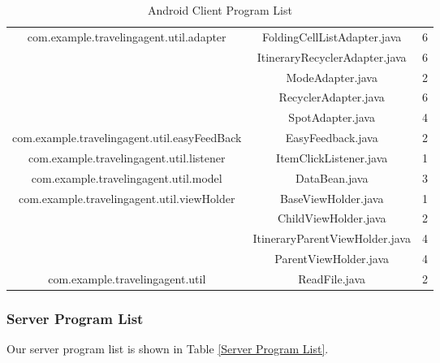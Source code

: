 \documentclass[10pt]{article}
\begin{document}
\begin{table}[htb]
\begin{tabular}{|c|c|c|}
		\multirow{4}{*}{com.example.travelingagent.util.adapter}
		&FoldingCellListAdapter.java &6 \\
		\cline{2-3}
		&ItineraryRecyclerAdapter.java &6 \\
		\cline{2-3}
		&ModeAdapter.java &2 \\
		\cline{2-3}
		&RecyclerAdapter.java &6 \\
		\cline{2-3}
		&SpotAdapter.java &4 \\
		\hline
		
		com.example.travelingagent.util.easyFeedBack &EasyFeedback.java &2 \\
		\hline
		
		com.example.travelingagent.util.listener &ItemClickListener.java &1 \\
		\hline
		
		com.example.travelingagent.util.model &DataBean.java &3 \\
		\hline
		
		\multirow{4}{*}{com.example.travelingagent.util.viewHolder}
		&BaseViewHolder.java &1 \\
		\cline{2-3}
		&ChildViewHolder.java &2 \\
		\cline{2-3}
		&ItineraryParentViewHolder.java &4 \\
		\cline{2-3}
		&ParentViewHolder.java &4 \\
		\hline
		
		com.example.travelingagent.util &ReadFile.java &2 \\
		\hline
		\end{tabular}

		\caption{Android Client Program List}
		\label{Android}
\end{table}

\subsubsection{Server Program List}
Our server program list is shown in Table \ref{Server Program List}.
\end{document}
